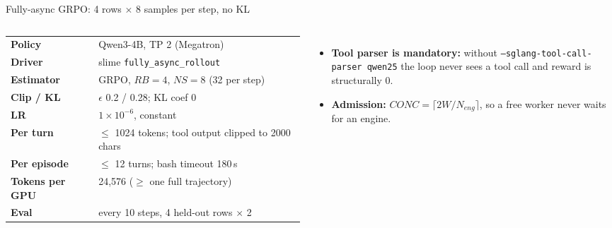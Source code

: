 \begin{frame}{Fully-async GRPO: 4 rows $\times$ 8 samples per step, no KL}
\begin{columns}[T]
\scriptsize
\begin{tabularx}{\linewidth}{@{}>{\bfseries}p{2.6cm}X@{}}
\toprule
Policy & Qwen3-4B, TP 2 (Megatron)\\
Driver & slime \texttt{fully\_async\_rollout}\\
Estimator & GRPO, $RB = 4$, $NS = 8$ (32 per step)\\
Clip / KL & $\epsilon$ 0.2 / 0.28; KL coef 0\\
LR & $1\times10^{-6}$, constant\\
Per turn & $\le$ 1024 tokens; tool output clipped to 2000 chars\\
Per episode & $\le$ 12 turns; bash timeout 180\,s\\
Tokens per GPU & 24,576 ($\ge$ one full trajectory)\\
Eval & every 10 steps, 4 held-out rows $\times$ 2\\
\bottomrule
\end{tabularx}
\begin{itemize}\footnotesize\setlength{\itemsep}{2mm}
\item \textbf{Tool parser is mandatory:} without \texttt{--sglang-tool-call-parser qwen25} the loop never sees a tool call and reward is structurally 0.
\item \textbf{Admission:} $CONC = \lceil 2W / N_{eng} \rceil$, so a free worker never waits for an engine.
\end{itemize}
\end{columns}
\end{frame}


